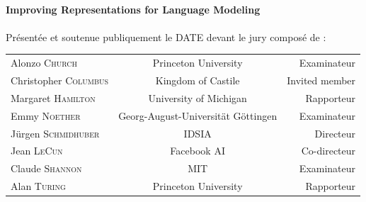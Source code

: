 \begin{titlepage}
\begin{center}
		\hrulefill\\[0.2cm]

		{\Large  \textbf{Improving Representations for Language Modeling		}}\\[0.1cm]

		\hrulefill\\

		\vspace{0.cm}
		\normalsize Présentée et soutenue publiquement le DATE devant le jury composé de :\\
		\vspace{0.4cm}
		\begin{tabular*}{\linewidth}{l c r}
			Alonzo \textsc{Church} & Princeton University & Examinateur \\
			Christopher \textsc{Columbus} & Kingdom of Castile & Invited member\\
			Margaret \textsc{Hamilton} & University of Michigan & Rapporteur \\
			Emmy \textsc{Noether} & Georg-August-Universität Göttingen & Examinateur \\
			Jürgen \textsc{Schmidhuber} & IDSIA & Directeur\\
			Jean \textsc{LeCun} & Facebook AI & Co-directeur\\
			Claude \textsc{Shannon} & MIT & Examinateur \\
			Alan \textsc{Turing} & Princeton University & Rapporteur \\
		\end{tabular*}
	\end{center}

\end{titlepage}


\newpage
\null
\thispagestyle{empty}
\newpage
